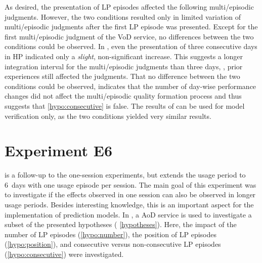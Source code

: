 As desired, the presentation of \ac{LP} episodes affected the following multi\-/episodic judgments.
However, the two conditions resulted only in limited variation of multi\-/episodic judgments after the first \ac{LP} episode was presented.
Except for the first multi\-/episodic judgment of the \ac{VoD} service, no differences between the two conditions could be observed.
In , even the presentation of three consecutive days in \ac{HP} indicated only a \emph{slight}, non-significant increase.
This suggests a longer integration interval for the multi\-/episodic judgments than three days, \ie, prior experiences still affected the judgments.
That no difference between the two conditions could be observed, indicates that the number of day-wise performance changes did not affect the multi\-/episodic quality formation process and thus suggests that \autoref{hypo:consecutive} is false.
The results of  can be used for model verification only, as the two conditions yielded very similar results.

\section{Experiment E6}
 is a follow-up to the one-session experiments, but extends the usage period to 6~days with one usage episode per session.
The main goal of this experiment was to investigate if the effects observed in one session can also be observed in longer usage periods.
Besides interesting knowledge, this is an important aspect for the implementation of prediction models.
In , a \ac{AoD} service is used to investigate a subset of the presented hypotheses (\cf{} \autoref{hypotheses}).
Here, the impact of the number of \ac{LP} episodes (\autoref{hypo:number}), the position of \ac{LP} episodes (\autoref{hypo:position}), and consecutive versus non-consecutive \ac{LP} episodes (\autoref{hypo:consecutive}) were investigated.

